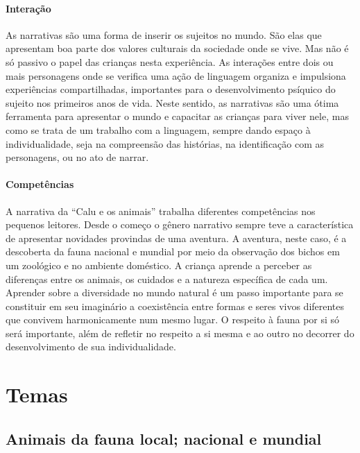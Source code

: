 \documentclass[11pt]{extarticle}
\begin{document}
\paragraph{Interação} 
As narrativas são uma forma de inserir os sujeitos no mundo. 
São elas que apresentam boa parte dos valores culturais da sociedade 
onde se vive. Mas não é só passivo o papel das crianças nesta experiência. 
As interações entre dois ou mais personagens onde se verifica
uma ação de linguagem organiza e impulsiona experiências compartilhadas,
importantes para o desenvolvimento psíquico do sujeito nos primeiros anos de vida.
Neste sentido, as narrativas são uma ótima ferramenta para
apresentar o mundo e capacitar as crianças para viver nele, mas como se
trata de um trabalho com a linguagem, sempre dando espaço à individualidade, 
seja na compreensão das histórias, na identificação com as personagens, ou 
no ato de narrar. 


\paragraph{Competências} 
A narrativa da ``Calu e os animais'' trabalha diferentes competências
nos pequenos leitores. Desde o começo o gênero narrativo sempre teve
a característica de apresentar novidades provindas de uma aventura.
A aventura, neste caso, é a descoberta da fauna nacional e mundial
por meio da observação dos bichos em um zoológico e no ambiente doméstico.
A criança aprende a perceber as diferenças entre os animais, os cuidados
e a natureza específica de cada um. Aprender sobre a diversidade
no mundo natural é um passo importante para se constituir em seu imaginário
a coexistência entre formas e seres vivos diferentes que convivem 
harmonicamente num mesmo lugar. O respeito à fauna por si só
será importante, além de refletir no respeito a si mesma e ao outro
no decorrer do desenvolvimento de sua individualidade. 

\section{Temas}

\subsection{Animais da fauna local; nacional e mundial}
\end{document}
